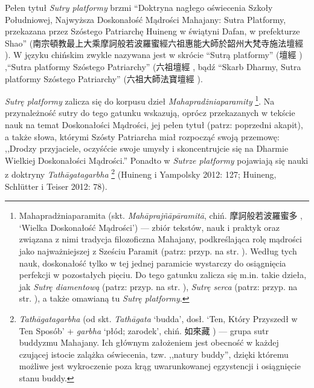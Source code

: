 Pełen tytuł \textit{Sutry platformy} brzmi ``Doktryna nagłego oświecenia Szkoły Południowej, Najwyższa Doskonałość Mądrości Mahajany: Sutra Platformy, przekazana przez Szóstego Patriarchę Huineng w świątyni Dafan, w prefekturze Shao'' (南宗頓教最上大乘摩訶般若波羅蜜經六祖惠能大師於韶州大梵寺施法壇經 ).
W języku chińskim zwykle nazywana jest w skrócie ``Sutrą platformy'' (壇經 ) ,``Sutra platformy Szóstego Patriarchy'' (六祖壇經 , bądź ``Skarb Dharmy, Sutra platformy Szóstego Patriarchy'' (六祖大師法寶壇經 ).

\textit{Sutrę platformy} zalicza się do korpusu dzieł \textit{Mahapradżniaparamity}%
\footnote{Mahapradżniaparamita (skt. \textit{Mahāprajñāpāramitā}, chiń. 摩訶般若波羅蜜多 , `Wielka Doskonałość Mądrości') --- zbiór tekstów, nauk i praktyk oraz związana z nimi tradycja filozoficzna Mahajany, podkreślająca rolę mądrości jako najważniejszej z Sześciu Paramit (patrz: przyp. na str. \pageref{Paramitas}).
Według tych nauk, doskonałość tylko w tej jednej paramicie wystarczy do osiągnięcia perfekcji w pozostałych pięciu. Do tego gatunku zalicza się m.in. takie dzieła, jak \textit{Sutrę diamentową} (patrz: przyp. na str. \pageref{DiamondSutra}), \textit{Sutrę serca} (patrz: przyp. na str. \pageref{HeartSutra}), a także omawianą tu \textit{Sutrę platformy}.}.
Na przynależność sutry do tego gatunku wskazują, oprócz przekazanych w tekście nauk na temat Doskonałości Mądrości, jej pełen tytuł (patrz: poprzedni akapit), a także słowa, którymi Szósty Patriarcha miał rozpocząć swoją przemowę: ,,Drodzy przyjaciele, oczyśćcie swoje umysły i skoncentrujcie się na Dharmie Wielkiej Doskonałości Mądrości.''
Ponadto w \textit{Sutrze platformy} pojawiają się nauki z doktryny \textit{Tathāgatagarbha}%
\footnote{\textit{Tathāgatagarbha} (od skt. \textit{Tathāgata} `budda', dosł. `Ten, Który Przyszedł w Ten Sposób' + \textit{garbha} `płód; zarodek', chiń. 如來藏 ) --- grupa sutr buddyzmu Mahajany.
Ich głównym założeniem jest obecność w każdej czującej istocie zalążka oświecenia, tzw. ,,natury buddy'', dzięki któremu możliwe jest wykroczenie poza krąg uwarunkowanej egzystencji i osiągnięcie stanu buddy.} %
(Huineng i Yampolsky 2012: 127; Huineng, Schlütter i Teiser 2012: 78).

